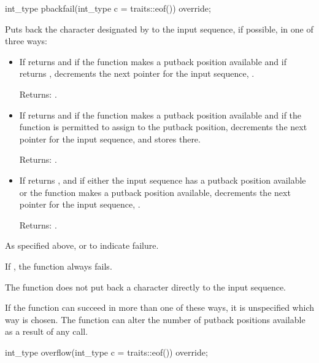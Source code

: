 %
\begin{itemdecl}
int_type pbackfail(int_type c = traits::eof()) override;
\end{itemdecl}

\begin{itemdescr}
\pnum
\effects
Puts back the character designated by  to the input
sequence, if possible, in one of three ways:
\begin{itemize}
\item
If
returns
and
if the function makes a putback position available
and if
returns
,
decrements the next pointer for the input sequence,
.

Returns:
.

\item
If
returns
and
if the function makes a putback position available
and if the function is permitted to assign to the putback position,
decrements the next pointer for the input sequence,
and stores  there.

Returns:
.

\item
If
returns
,
and if either the input sequence has a putback position available or
the function makes a putback position available,
decrements the next pointer for the input sequence,
.

Returns:
.
\end{itemize}

\pnum
\returns
As specified above, or
to indicate failure.

\pnum
\remarks
If
,
the function always fails.

\pnum
The function does not put back a character directly to the input sequence.

\pnum
If the function can succeed in more than one of these ways, it is
unspecified which way is chosen.
The function can alter the number of putback positions available as a result of any call.
\end{itemdescr}

%
\begin{itemdecl}
int_type overflow(int_type c = traits::eof()) override;
\end{itemdecl}

